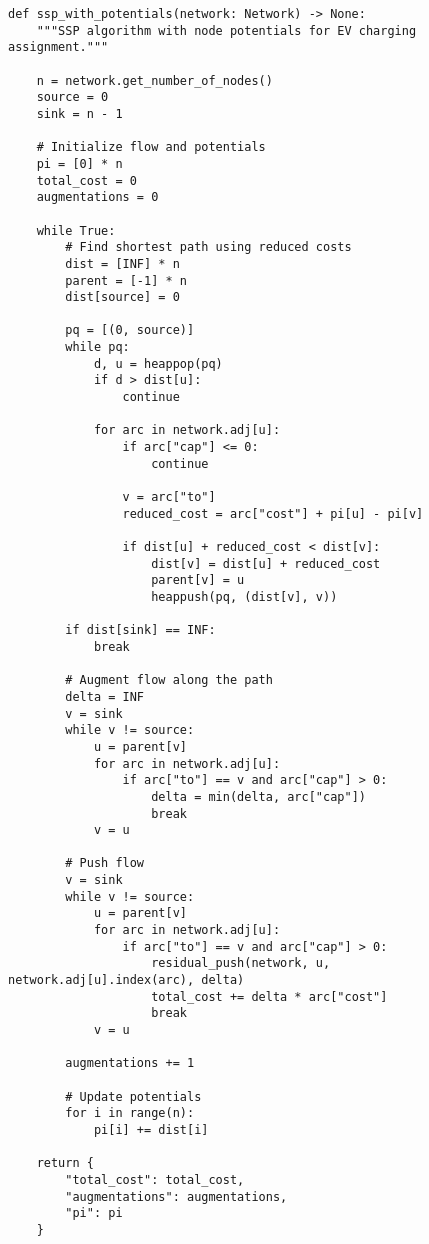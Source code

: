 \documentclass[12pt,a4paper]{article}
\begin{document}
\begin{lstlisting}[caption=Successive Shortest Path with Potentials]
def ssp_with_potentials(network: Network) -> None:
    """SSP algorithm with node potentials for EV charging assignment."""
    
    n = network.get_number_of_nodes()
    source = 0
    sink = n - 1
    
    # Initialize flow and potentials
    pi = [0] * n
    total_cost = 0
    augmentations = 0
    
    while True:
        # Find shortest path using reduced costs
        dist = [INF] * n
        parent = [-1] * n
        dist[source] = 0
        
        pq = [(0, source)]
        while pq:
            d, u = heappop(pq)
            if d > dist[u]:
                continue
                
            for arc in network.adj[u]:
                if arc["cap"] <= 0:
                    continue
                    
                v = arc["to"]
                reduced_cost = arc["cost"] + pi[u] - pi[v]
                
                if dist[u] + reduced_cost < dist[v]:
                    dist[v] = dist[u] + reduced_cost
                    parent[v] = u
                    heappush(pq, (dist[v], v))
        
        if dist[sink] == INF:
            break
            
        # Augment flow along the path
        delta = INF
        v = sink
        while v != source:
            u = parent[v]
            for arc in network.adj[u]:
                if arc["to"] == v and arc["cap"] > 0:
                    delta = min(delta, arc["cap"])
                    break
            v = u
            
        # Push flow
        v = sink
        while v != source:
            u = parent[v]
            for arc in network.adj[u]:
                if arc["to"] == v and arc["cap"] > 0:
                    residual_push(network, u, network.adj[u].index(arc), delta)
                    total_cost += delta * arc["cost"]
                    break
            v = u
            
        augmentations += 1
        
        # Update potentials
        for i in range(n):
            pi[i] += dist[i]
    
    return {
        "total_cost": total_cost,
        "augmentations": augmentations,
        "pi": pi
    }
\end{lstlisting}
\end{document}

